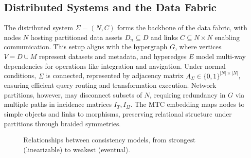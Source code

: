 \documentclass{amsart}
\begin{document}
\subsection{Distributed Systems and the Data Fabric} \label{subsec:distributed_databases}
The distributed system \( \Sigma = (N, C) \) forms the backbone of the data fabric, with nodes \( N \) hosting partitioned data assets \( D_n \subseteq D \) and links \( C \subseteq N \times N \) enabling communication. This setup aligns with the hypergraph \( G \), where vertices \( V = D \cup M \) represent datasets and metadata, and hyperedges \( E \) model multi-way dependencies for operations like integration and navigation. Under normal conditions, \( \Sigma \) is connected, represented by adjacency matrix \( A_{\Sigma} \in \{0,1\}^{|N| \times |N|} \), ensuring efficient query routing and transformation execution. Network partitions, however, may disconnect subsets of \( N \), requiring redundancy in \( G \) via multiple paths in incidence matrices \( I_T, I_H \). The MTC embedding maps nodes to simple objects and links to morphisms, preserving relational structure under partitions through braided symmetries.

\begin{figure}[h!]
    \centering
    \caption{Relationships between consistency models, from strongest (linearizable) to weakest (eventual).}
    \label{fig:consistency_models}
\end{figure}

 
\end{document}
